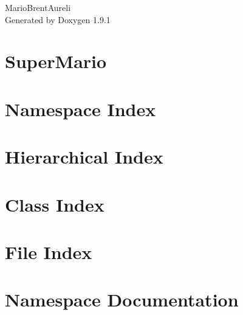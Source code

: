 \let\mypdfximage\pdfximage\def\pdfximage{\immediate\mypdfximage}\documentclass[twoside]{book}
\newcommand{\+}{\discretionary{\mbox{\scriptsize$\hookleftarrow$}}{}{}}
\newcommand{\clearemptydoublepage}{%
  \newpage{\pagestyle{empty}\cleardoublepage}%
}
\begin{document}
\raggedbottom

\hypersetup{pageanchor=false,
             bookmarksnumbered=true,
             pdfencoding=unicode
            }
\begin{titlepage}
\vspace*{7cm}
\begin{center}%
{\Large Mario\+Brent\+Aureli }\\
\vspace*{1cm}
{\large Generated by Doxygen 1.9.1}\\
\end{center}
\end{titlepage}
\clearemptydoublepage
{}
\tableofcontents
\clearemptydoublepage
{}
\hypersetup{pageanchor=true}

\chapter{Super\+Mario}
\label{md__c___git_hub__super_mario__r_e_a_d_m_e}

\chapter{Namespace Index}

\chapter{Hierarchical Index}

\chapter{Class Index}

\chapter{File Index}

\chapter{Namespace Documentation}









\end{document}
